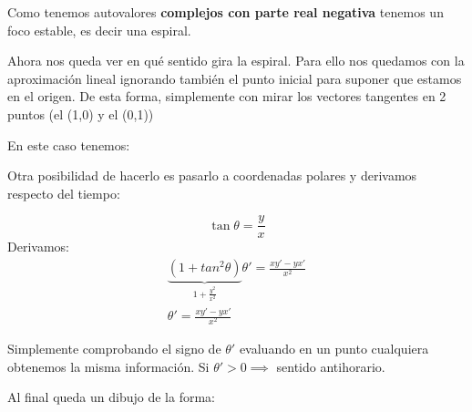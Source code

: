 \documentclass[nochap]{apuntes}
\begin{document}
\begin{problem}[1]
Como tenemos autovalores \textbf{complejos con parte real negativa} tenemos un foco estable, es decir una espiral. 

Ahora nos queda ver en qué sentido gira la espiral. Para ello nos quedamos con la aproximación lineal ignorando también el punto inicial para suponer que estamos en el origen. De esta forma, simplemente con mirar los vectores tangentes en 2 puntos (el (1,0) y el (0,1))

En este caso tenemos:
\begin{figure}[hbt]
\centering
{}
\end{figure}
Otra posibilidad de hacerlo es pasarlo a coordenadas polares y derivamos respecto del tiempo:


\[\tan\theta = \frac{y}{x}\]
Derivamos:
\begin{gather*}
\underbrace{(1+tan^2\theta)}_{1+\frac{y^2}{x^2}}\theta' = \frac{xy'-yx'}{x^2}\\
\theta' =\frac{xy'-yx'}{x^2}
\end{gather*}

Simplemente comprobando el signo de $\theta'$ evaluando en un punto cualquiera obtenemos la misma información.  Si $\theta'>0\implies$ sentido antihorario. 

Al final queda un dibujo de la forma:

\begin{figure}[hbt]
\centering
{}
\end{figure}


\end{problem}
\end{document}
